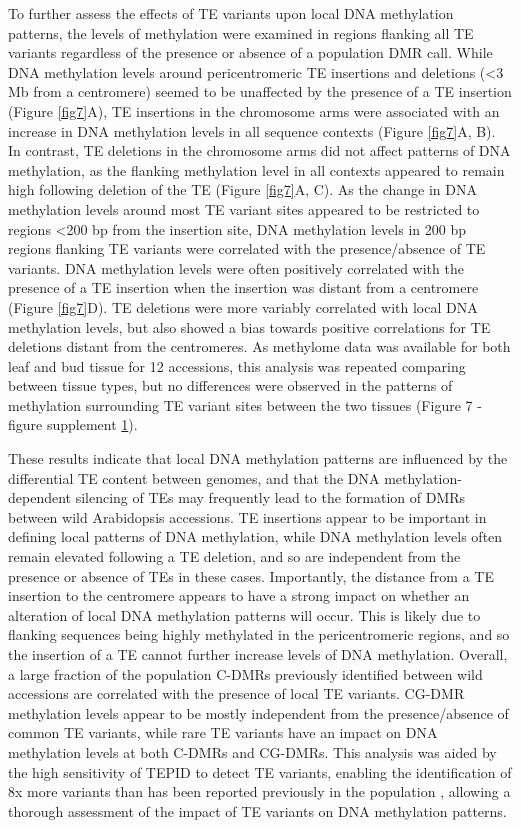 \documentclass[12pt]{article}
\begin{document}
To further assess the effects of TE variants upon local DNA
methylation patterns, the levels of methylation were examined in
regions flanking all TE variants regardless of the presence or absence
of a population DMR call. While DNA methylation levels around
pericentromeric TE insertions and deletions (\textless{}3 Mb from a
centromere) seemed to be unaffected by the presence of a TE insertion
(Figure \ref{fig7}A), TE insertions in the chromosome arms were
associated with an increase in DNA methylation levels in all sequence
contexts (Figure \ref{fig7}A, B). In contrast, TE deletions in the
chromosome arms did not affect patterns of DNA methylation, as the
flanking methylation level in all contexts appeared to remain high
following deletion of the TE (Figure \ref{fig7}A, C). As the change in
DNA methylation levels around most TE variant sites appeared to be
restricted to regions \textless{}200 bp from the insertion site, DNA
methylation levels in 200 bp regions flanking TE variants were
correlated with the presence/absence of TE variants. DNA methylation
levels were often positively correlated with the presence of a TE
insertion when the insertion was distant from a centromere (Figure
\ref{fig7}D). TE deletions were more variably correlated with local
DNA methylation levels, but also showed a bias towards positive
correlations for TE deletions distant from the centromeres. As
methylome data was available for both leaf and bud tissue for 12
accessions, this analysis was repeated comparing between tissue types,
but no differences were observed in the patterns of methylation
surrounding TE variant sites between the two tissues (Figure 7 -
figure supplement \hyperref[fig7s1]{1}).

These results indicate that local DNA methylation patterns are
influenced by the differential TE content between genomes, and that
the DNA methylation-dependent silencing of TEs may frequently lead to
the formation of DMRs between wild Arabidopsis accessions. TE
insertions appear to be important in defining local patterns of DNA
methylation, while DNA methylation levels often remain elevated
following a TE deletion, and so are independent from the presence or
absence of TEs in these cases. Importantly, the distance from a TE
insertion to the centromere appears to have a strong impact on whether
an alteration of local DNA methylation patterns will occur. This is
likely due to flanking sequences being highly methylated in the
pericentromeric regions, and so the insertion of a TE cannot further
increase levels of DNA methylation. Overall, a large fraction of the
population C-DMRs previously identified between wild accessions are
correlated with the presence of local TE variants. CG-DMR methylation
levels appear to be mostly independent from the presence/absence of
common TE variants, while rare TE variants have an impact on DNA
methylation levels at both C-DMRs and CG-DMRs. This analysis was aided
by the high sensitivity of TEPID to detect TE variants, enabling the
identification of 8x more variants than has been reported previously
in the population \cite{Quadrana:2016bi}, allowing a thorough
assessment of the impact of TE variants on DNA methylation patterns.
\end{document}
